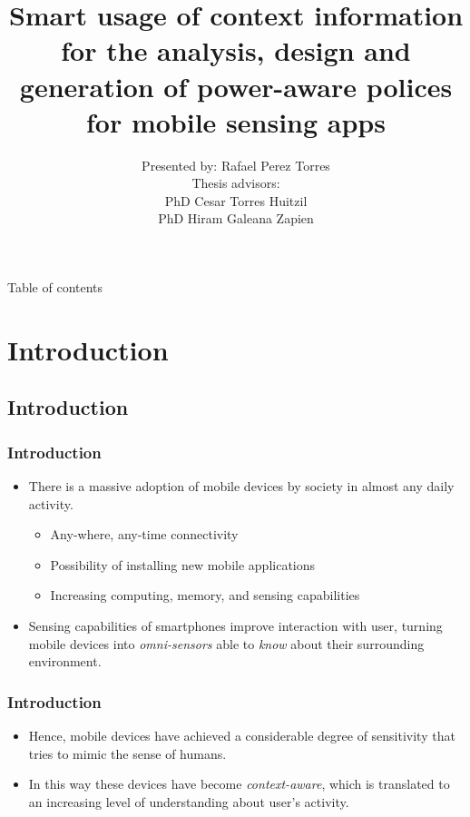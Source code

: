 \documentclass[compress,9pt,xcolor={dvipsnames,table}]{beamer}
\title[Smart usage of context information for the analysis, design and generation of power-aware polices for mobile sensing apps]{ Smart usage of context information for the analysis, design and generation of power-aware polices for mobile sensing apps}
\author[Rafael Perez Torres]{Presented by: Rafael Perez Torres\\[0.5cm] Thesis advisors:\\PhD Cesar Torres Huitzil\\PhD Hiram Galeana Zapien}
\institute{Cinvestav Tamaulipas}
\date{}
\begin{document}
\frame{\maketitle}
\begin{frame}{Table of contents}
	\tableofcontents[hideallsubsections]
\end{frame}

\section{Introduction}
\subsection{Introduction}
\begin{frame}\frametitle{Introduction}
\begin{itemize}
	\item There is a massive adoption of mobile devices by society in almost any daily activity.
	\begin{itemize}
		\item Any-where, any-time connectivity
		\item Possibility of installing new mobile applications
		\item Increasing computing, memory, and sensing capabilities
	\end{itemize}
	\item Sensing capabilities of smartphones improve interaction with user, turning mobile devices into \emph{omni-sensors} able to \emph{know} about their surrounding environment.
\end{itemize}
\end{frame}

\begin{frame}\frametitle{Introduction}
\begin{itemize}
	\item Hence, mobile devices have achieved a considerable degree of sensitivity that tries to mimic the sense of humans.
	\item In this way these devices have become \emph{context-aware}, which is translated to an increasing level of understanding about user's activity.
\end{itemize}
\end{frame}
\end{document}
